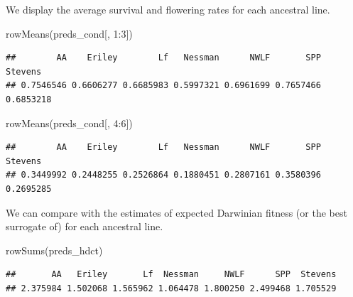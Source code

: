 \documentclass[
  ignorenonframetext,
]{beamer}
\newenvironment{Shaded}{\begin{snugshade}}{\end{snugshade}}
\newcommand{\DecValTok}[1]{\textcolor[rgb]{0.00,0.00,0.81}{#1}}
\newcommand{\FunctionTok}[1]{\textcolor[rgb]{0.00,0.00,0.00}{#1}}
\newcommand{\NormalTok}[1]{#1}
\newcommand{\SpecialCharTok}[1]{\textcolor[rgb]{0.00,0.00,0.00}{#1}}
\begin{document}
\begin{frame}[fragile]{}
\protect\hypertarget{section-42}{}
We display the average survival and flowering rates for each ancestral
line.

\vspace{12pt}
\tiny

\begin{Shaded}
\begin{Highlighting}[]
\FunctionTok{rowMeans}\NormalTok{(preds\_cond[, }\DecValTok{1}\SpecialCharTok{:}\DecValTok{3}\NormalTok{])}
\end{Highlighting}
\end{Shaded}

\begin{verbatim}
##        AA    Eriley        Lf   Nessman      NWLF       SPP   Stevens 
## 0.7546546 0.6606277 0.6685983 0.5997321 0.6961699 0.7657466 0.6853218
\end{verbatim}

\begin{Shaded}
\begin{Highlighting}[]
\FunctionTok{rowMeans}\NormalTok{(preds\_cond[, }\DecValTok{4}\SpecialCharTok{:}\DecValTok{6}\NormalTok{])}
\end{Highlighting}
\end{Shaded}

\begin{verbatim}
##        AA    Eriley        Lf   Nessman      NWLF       SPP   Stevens 
## 0.3449992 0.2448255 0.2526864 0.1880451 0.2807161 0.3580396 0.2695285
\end{verbatim}

\vspace{12pt}
\normalsize

We can compare with the estimates of expected Darwinian fitness (or the
best surrogate of) for each ancestral line.

\vspace{12pt}
\tiny

\begin{Shaded}
\begin{Highlighting}[]
\FunctionTok{rowSums}\NormalTok{(preds\_hdct)}
\end{Highlighting}
\end{Shaded}

\begin{verbatim}
##       AA   Eriley       Lf  Nessman     NWLF      SPP  Stevens 
## 2.375984 1.502068 1.565962 1.064478 1.800250 2.499468 1.705529
\end{verbatim}
\end{frame}
\end{document}
